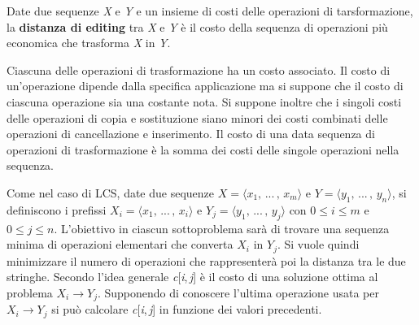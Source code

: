 \documentclass[10pt, a4paper]{report}
\begin{document}
Date due sequenze \textit{X} e \textit{Y} e un insieme di costi delle operazioni di tarsformazione, la \textbf{distanza di editing} tra \textit{X} e \textit{Y} è il costo della sequenza di operazioni più economica che trasforma \textit{X} in \textit{Y}.

Ciascuna delle operazioni di trasformazione ha un costo associato. Il costo di un'operazione dipende dalla specifica applicazione ma si suppone che il costo di ciascuna operazione sia una costante nota. Si suppone inoltre che i singoli costi delle operazioni di copia e sostituzione siano minori dei costi combinati delle operazioni di cancellazione e inserimento. Il costo di una data sequenza di operazioni di trasformazione è la somma dei costi delle singole operazioni nella sequenza.

Come nel caso di LCS, date due sequenze $X = \langle x_1,\,...\,,\,x_m \rangle$ e $Y = \langle y_1,\,...\,,\,y_n \rangle$, si definiscono i prefissi $X_i = \langle x_1,\,...\,,\,x_i \rangle$ e $Y_j = \langle y_1,\,...\,,\,y_j \rangle$ con $0 \leq i \leq m$ e $0 \leq j \leq n$. L'obiettivo in ciascun sottoproblema sarà di trovare una sequenza minima di operazioni elementari che converta $X_i$ in $Y_j$. Si vuole quindi minimizzare il numero di operazioni che rappresenterà poi la distanza tra le due stringhe. Secondo l'idea generale \textit{c}[\textit{i},\,\textit{j}] è il costo di una soluzione ottima al problema $X_i \rightarrow Y_j$. Supponendo di conoscere l'ultima operazione usata per $X_i \rightarrow Y_j$ si può calcolare \textit{c}[\textit{i},\,\textit{j}] in funzione dei valori precedenti.
\end{document}
